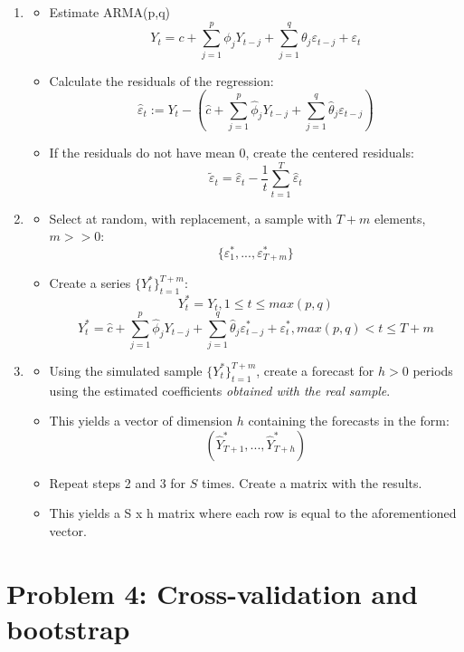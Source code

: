 \documentclass[11pt, a4paper]{report}
\theoremstyle{plain}
\theoremstyle{plain}
\theoremstyle{remark}
\begin{document}
\begin{enumerate}
	\item \begin{itemize}
		\item Estimate ARMA(p,q)
		$$ Y_t = c + \sum_{j=1}^p \phi_j Y_{t-j} + \sum_{j=1}^q \theta_j \varepsilon_{t-j} + \varepsilon_t$$
		
		\item Calculate the residuals of the regression:
		$$ \hat{\varepsilon}_t := Y_t - (\hat{c} + \sum_{j=1}^p \hat{\phi}_j Y_{t-j} + \sum_{j=1}^q \hat{\theta}_j \varepsilon_{t-j})$$
		
		\item If the residuals do not have mean 0, create the centered residuals:
		$$ \tilde{\varepsilon}_t = \hat{\varepsilon}_t - \frac{1}{t} \sum_{t=1}^T \hat{\varepsilon}_t$$
	\end{itemize}
	
	\item \begin{itemize}
		\item Select at random, with replacement, a sample with $T + m$ elements, $m >> 0$:
		$$\{\varepsilon^*_1, ..., \varepsilon^*_{T+m}\}$$
		\item Create a series $\{Y^*_t\}_{t=1}^{T+m}$:
		$$ Y_t^* = Y_t, 1 \leq t \leq max(p,q) $$
		$$ Y_t^* = \hat{c} + \sum_{j=1}^p \hat{\phi}_j Y_{t-j} + \sum_{j=1}^q \hat{\theta}_j \varepsilon_{t-j}^* + \varepsilon_t^*, max(p,q) < t \leq T + m $$
	\end{itemize}
	\item \begin{itemize}
		\item Using the simulated sample $\{Y^*_t\}_{t=1}^{T+m}$, create a forecast for $h >0$ periods using the estimated coefficients \textit{obtained with the real sample}.
		\item This yields a vector of dimension $h$ containing the forecasts in the form:
		$$(\hat{Y}^*_{T+1}, ..., \hat{Y}^*_{T+h})$$ 
		\item Repeat steps 2 and 3 for $S$ times. Create a matrix with the results.
		\item This yields a S x h matrix where each row is equal to the aforementioned vector.
	\end{itemize}
\end{enumerate}

\chapter{Problem 4: Cross-validation and bootstrap}
\end{document}
